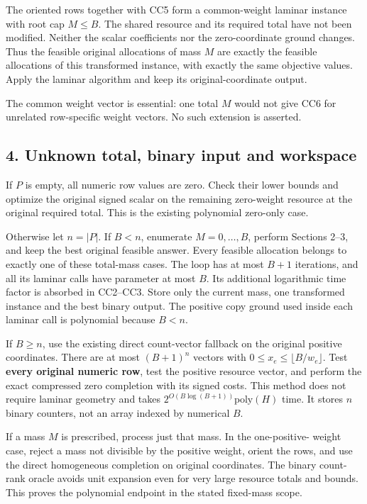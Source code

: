 The oriented rows together with CC5 form a common-weight laminar instance with root cap \(M\le B\). The shared resource and its required total have not been modified. Neither the scalar coefficients nor the zero-coordinate ground changes. Thus the feasible original allocations of mass \(M\) are exactly the feasible allocations of this transformed instance, with exactly the same objective values. Apply the laminar algorithm and keep its original-coordinate output.

The common weight vector is essential: one total \(M\) would not give CC6 for unrelated row-specific weight vectors. No such extension is asserted.

\hypertarget{af-3beb839889-unknown-total-binary-input-and-workspace}{%
\subsection{4. Unknown total, binary input and workspace}\label{af-3beb839889-unknown-total-binary-input-and-workspace}}

If \(P\) is empty, all numeric row values are zero. Check their lower bounds and optimize the original signed scalar on the remaining zero-weight resource at the original required total. This is the existing polynomial zero-only case.

Otherwise let \(n=|P|\). If \(B<n\), enumerate \(M=0,\ldots,B\), perform Sections 2--3, and keep the best original feasible answer. Every feasible allocation belongs to exactly one of these total-mass cases. The loop has at most \(B+1\) iterations, and all its laminar calls have parameter at most \(B\). Its additional logarithmic time factor is absorbed in CC2--CC3. Store only the current mass, one transformed instance and the best binary output. The positive copy ground used inside each laminar call is polynomial because \(B<n\).

If \(B\ge n\), use the existing direct count-vector fallback on the original positive coordinates. There are at most \((B+1)^n\) vectors with \(0\le x_e\le\lfloor B/w_e\rfloor\). Test \textbf{every original numeric row}, test the positive resource vector, and perform the exact compressed zero completion with its signed costs. This method does not require laminar geometry and takes \(2^{O(B\log(B+1))}\mathrm{poly}(H)\) time. It stores \(n\) binary counters, not an array indexed by numerical \(B\).

If a mass \(M\) is prescribed, process just that mass. In the one-positive- weight case, reject a mass not divisible by the positive weight, orient the rows, and use the direct homogeneous completion on original coordinates. The binary count-rank oracle avoids unit expansion even for very large resource totals and bounds. This proves the polynomial endpoint in the stated fixed-mass scope.

